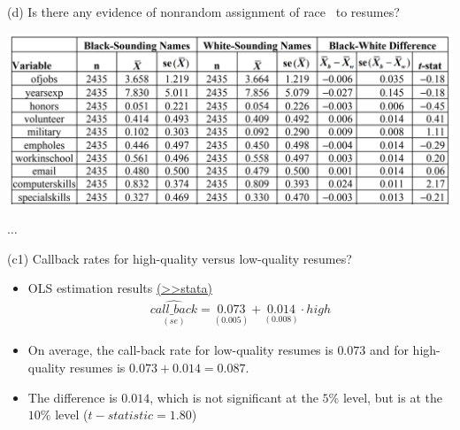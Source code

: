 \documentclass[
  10pt,
  ignorenonframetext,
]{beamer}
\begin{document}
\begin{frame}{(d) Is there any evidence of nonrandom assignment of race
~to resumes?}
\protect\hypertarget{d-is-there-any-evidence-of-nonrandom-assignment-of-race-to-resumes-1}{}
\footnotesize

\begin{center}\includegraphics[width=1\linewidth]{pictures/otherW} \end{center}

\(\ldots\)
\end{frame}

\begin{frame}{(c1) Callback rates for high-quality versus low-quality
resumes?}
\protect\hypertarget{c1-callback-rates-for-high-quality-versus-low-quality-resumes}{}
\begin{itemize}
\item
  OLS estimation results
  \footnotesize \protect\hyperlink{res3-regHigh}{(\textgreater\textgreater stata)}
  \normalsize \[
  \begin{aligned}
  \underset{(se)}{\widehat{call\_back}} = \underset{(0.005)}{0.073} + \underset{(0.008)}{0.014}\cdot high
  \end{aligned}
  \]
\item
  On average, the call-back rate for low-quality resumes is \(0.073\)
  and for high-quality resumes is \(0.073 + 0.014 = 0.087\).
\item
  The difference is \(0.014\), which is not significant at the \(5\%\)
  level, but is at the \(10\%\) level (\(t-statistic = 1.80\))
\end{itemize}
\end{frame}
\end{document}
